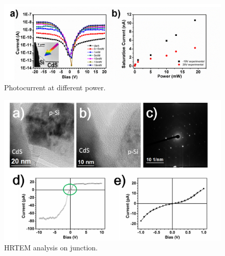 \begin{figure}  
\includegraphics[width=\textwidth]{figures/figure3_5}
\caption[Photocurrent at different power.]{Photocurrent at different power.
\label{fig:fig3_5}}
\end{figure}

\begin{figure}  
\includegraphics[width=\textwidth]{figures/figure3_s3}
\caption[HRTEM analysis on junction.]{HRTEM analysis on junction.
\label{fig:fig3_s3}}
\end{figure}

